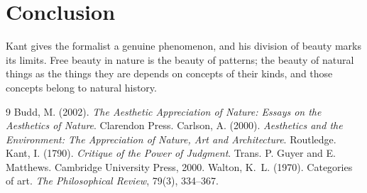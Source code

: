 \documentclass{situationist-preprint}
\begin{document}
\section{Conclusion}

Kant gives the formalist a genuine phenomenon, and his division of beauty marks its limits. Free beauty in nature is the beauty of patterns; the beauty of natural things as the things they are depends on concepts of their kinds, and those concepts belong to natural history.

\begin{thebibliography}{9}\small
{} Budd, M. (2002). \emph{The Aesthetic Appreciation of Nature: Essays on the Aesthetics of Nature}. Clarendon Press.
 Carlson, A. (2000). \emph{Aesthetics and the Environment: The Appreciation of Nature, Art and Architecture}. Routledge.
 Kant, I. (1790). \emph{Critique of the Power of Judgment}. Trans. P. Guyer and E. Matthews. Cambridge University Press, 2000.
 Walton, K.~L. (1970). Categories of art. \emph{The Philosophical Review}, 79(3), 334--367.
\end{thebibliography}
\end{document}
